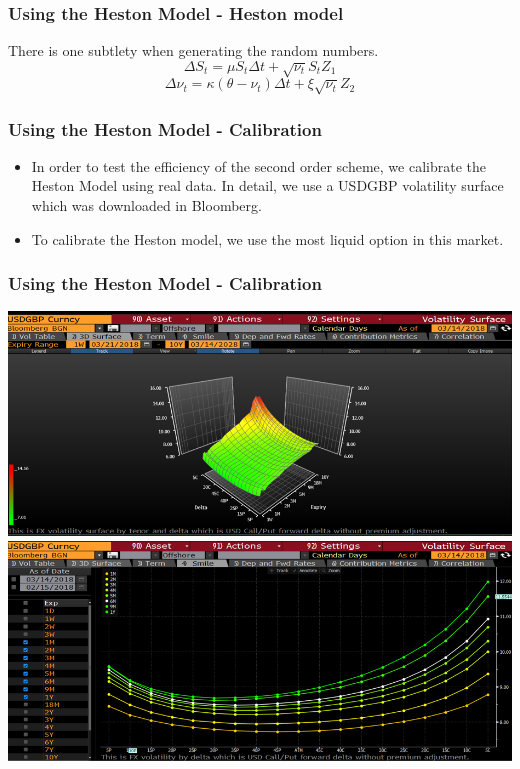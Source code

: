 \documentclass[12pt]{beamer}
\begin{document}
\begin{frame}
\frametitle{Using the Heston Model - Heston model}
There is one subtlety when generating the random numbers.
$$\Delta S_t=\mu S_t\Delta t+\sqrt{\nu_t}S_tZ_1$$
$$\Delta\nu_t = \kappa(\theta-\nu_t)\Delta t+\xi\sqrt{\nu_t}Z_2$$
\end{frame}

\begin{frame}
\frametitle{Using the Heston Model - Calibration}
\begin{itemize}
  \item In order to test the efficiency of the second order scheme, we calibrate the Heston Model using real data. In detail, we use a USDGBP volatility surface which was downloaded in Bloomberg.
  \item To calibrate the Heston model, we use the most liquid option in this market.
\end{itemize}
\end{frame}

\begin{frame}
\frametitle{Using the Heston Model - Calibration}
\centering
\includegraphics[width=.75\textwidth]{bloomberg1.png}
\\[.5cm]
\includegraphics[width=.75\textwidth]{bloomberg2.png}
\end{frame}
\end{document}
